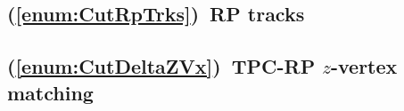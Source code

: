 








\subsection{(\ref{enum:CutRpTrks})~RP tracks}





\subsection{(\ref{enum:CutDeltaZVx})~TPC-RP \texorpdfstring{$z$}{z}-vertex matching}

